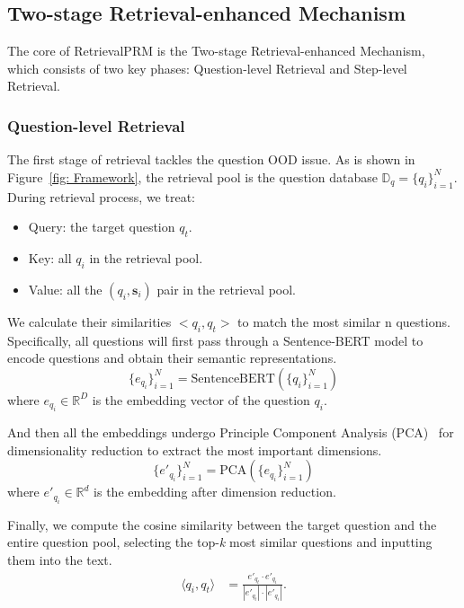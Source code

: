 \subsection{Two-stage Retrieval-enhanced Mechanism}
The core of RetrievalPRM is the Two-stage Retrieval-enhanced Mechanism, which consists of two key phases: Question-level Retrieval and Step-level Retrieval.

\subsubsection{Question-level Retrieval}
\label{question-level retrieval}
The first stage of retrieval tackles the question OOD issue. As is shown in Figure~\ref{fig: Framework}, the retrieval pool is the question database $\mathbb{D}_q = \{q_i\}_{i=1}^N$. During retrieval process, we treat:
\begin{itemize}[leftmargin=10pt]
    \item Query: the target question $q_t$.
    \item Key: all $q_i$ in the retrieval pool.
    \item Value: all the $(q_i,\mathbf{s}_i)$ pair in the retrieval pool.
\end{itemize}
We calculate their similarities $<q_i,q_t>$ to match the most similar n questions. Specifically, all questions will first pass through a Sentence-BERT model to encode questions and obtain their semantic representations.
\begin{equation}
    \{e_{q_i}\}_{i=1}^N = \text{SentenceBERT}(\{q_i\}_{i=1}^N)
\end{equation}
where $e_{q_i} \in \mathbb{R}^{D}$ is the embedding vector of the question $q_i$.

And then all the embeddings undergo Principle Component Analysis (PCA)~\cite{kurita2021principal} for dimensionality reduction to extract the most important dimensions. 
\begin{equation}
    \{e'_{q_i}\}_{i=1}^N = \text{PCA}( \{e_{q_i}\}_{i=1}^N )
\end{equation}
where $e'_{q_i} \in \mathbb{R}^d$ is the embedding after dimension reduction.

Finally, we compute the cosine similarity between the target question and the entire question pool, selecting the top-\textit{k} most similar questions and inputting them into the text.
\begin{equation}
    \begin{aligned}
    \langle q_i,q_t\rangle &= \frac{e'_{q_t} \cdot  e'_{q_i}}{|e'_{q_t}|\cdot|e'_{q_i}|}.\\
    \end{aligned}
\end{equation}

